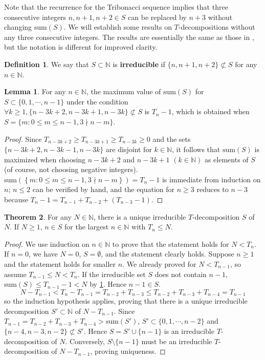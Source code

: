 \documentclass{article}
\theoremstyle{definition}
\newtheorem{theorem}{Theorem}
\newtheorem{lemma}[theorem]{Lemma}
\newtheorem*{definition}{Definition}
\begin{document}
Note that the recurrence for the Tribonacci sequence implies that three consecutive integers $n, n+1, n+2\in S$ can be replaced by $n+3$ without changing $\text{sum}(S)$. We will establish some results on $T$-decompositions without any three consecutive integers. The results are essentially the same as those in \cite{cow}, but the notation is different for improved clarity.

\begin{definition}
We say that $S\subset \mathbb{N}$ is \textbf{irreducible} if $\{n,n+1,n+2\} \not\subset S$ for any $n\in \mathbb{N}$.
\end{definition}

\begin{lemma}
\label{lemma}
For any $n\in \mathbb{N}$, the maximum value of $\text{sum}(S)$ for $S\subset\{0,1,\cdots,n-1\}$ under the condition $\forall k\geq 1,  \{n-3k+2, n-3k+1, n-3k\}\not\subset S$ is $T_n-1$, which is obtained when $S=\{m: 0\leq m\leq n-1, 3\nmid n-m\}$.
\end{lemma}
\begin{proof}
Since
\(
  T_{n-3k+2} \geq T_{n-3k+1} \geq T_{n-3k}\geq0
\)
and the sets
\(
  \{n-3k+2, n-3k-1, n-3k\}
\)
are disjoint for \( k \in \mathbb{N} \), it follows that $\text{sum}(S)$ is maximized when choosing $n-3k+2$ and $n-3k+1$ $(k\in \mathbb{N})$ as elements of $S$ (of course, not choosing negative integers). $\text{sum} \left(\left\{m: 0\leq m\leq n-1, 3\nmid n-m\right\} \right)=T_n-1$ is immediate from induction on $n$; $n\leq2$ can be verified by hand, and the equation for $n\geq3$ reduces to $n-3$ because $T_n-1=T_{n-1}+T_{n-2}+\left(T_{n-3}-1 \right)$. 
\end{proof}

\begin{theorem}
\label{thm 1} For any $N\in \mathbb{N}$, there is a unique irreducible $T$-decomposition $S$ of $N$. If $N\geq 1$, $n\in S$ for the largest $n\in \mathbb{N}$ with $T_n \leq N$.
\end{theorem}

\begin{proof}
We use induction on $n\in\mathbb{N}$ to prove that the statement holds for $N<T_{n}$. If $n=0$, we have $N=0$, $S=\emptyset$, and the statement clearly holds. Suppose $n\geq 1$ and the statement holds for smaller $n$. We already proved for $N<T_{n-1}$, so assume $T_{n-1}\leq N<T_n$. If the irreducible set $S$ does not contain $n-1$, $\text{sum}(S)\leq T_{n-1}-1<N$ by \cref{lemma}. Hence $n-1\in S$.
\[
N-T_{n-1}<T_n-T_{n-1}=T_{n-2}+T_{n-3}\leq T_{n-2}+T_{n-3}+T_{n-4}=T_{n-1}
\]
so the induction hypothesis applies, proving that there is a unique irreducible decomposition $S'\subset\mathbb{N}$ of $N-T_{n-1}$. Since $T_{n-1}=T_{n-2}+T_{n-3}+T_{n-4}>\text{sum}(S')$, $S'\subset\{0,1,\cdots,n-2\}$ and $\{n-4, n-3, n-2\}\not\subset S'$. Hence $S=S'\cup\{n-1\}$ is an irreducible $T$-decomposition of $N$. Conversely, $S\setminus\{n-1\}$ must be an irreducible $T$-decomposition of $N-T_{n-1}$, proving uniqueness.  
\end{proof}
\end{document}
